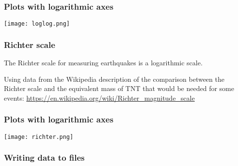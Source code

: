 \documentclass{beamer}
\begin{document}
\begin{frame}[fragile]
\frametitle{Plots with logarithmic axes}
\texttt{[image: loglog.png]}
\end{frame}

\begin{frame}[fragile]
\frametitle{Richter scale}
The Richter scale for measuring earthquakes is a logarithmic scale.

\bigskip

Using data from the Wikipedia description of the comparison between the Richter scale and the equivalent mass of TNT that would be needed for some events:
\url{https://en.wikipedia.org/wiki/Richter_magnitude_scale}

\end{frame}

\begin{frame}[fragile]
\frametitle{Plots with logarithmic axes}
\texttt{[image: richter.png]}
\end{frame}


\begin{frame}[fragile]
\frametitle{Writing data to files}

\end{frame}


\end{document}

